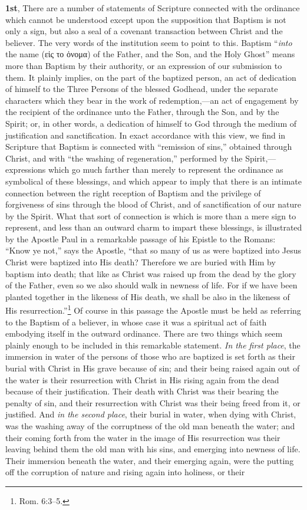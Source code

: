 \documentclass[
  english,
]{book}
\newcommand{\textgreek}[2][]{\foreignlanguage{greek}{#2}}
\begin{document}
\textbf{1st}, There are a number of statements of Scripture connected with the ordinance which cannot be understood except upon the supposition that Baptism is not only a sign, but also a seal of a covenant transaction between Christ and the believer. The very words of the institution seem to point to this. Baptism ``\emph{into} the name (\textgreek{εἰς το ὀνομα}) of the Father, and the Son, and the Holy Ghost'' means more than Baptism by their authority, or an expression of our submission to them. It plainly implies, on the part of the baptized person, an act of dedication of himself to the Three Persons of the blessed Godhead, under the separate characters which they bear in the work of redemption,---an act of engagement by the recipient of the ordinance unto the Father, through the Son, and by the Spirit; or, in other words, a dedication of himself to God through the medium of justification and sanctification. In exact accordance with this view, we find in Scripture that Baptism is connected with ``remission of sins,'' obtained through Christ, and with ``the washing of regeneration,'' performed by the Spirit,---expressions which go much farther than merely to represent the ordinance as symbolical of these blessings, and which appear to imply that there is an intimate connection between the right reception of Baptism and the privilege of forgiveness of sins through the blood of Christ, and of sanctification of our nature by the Spirit. What that sort of connection is which is more than a mere sign to represent, and less than an outward charm to impart these blessings, is illustrated by the Apostle Paul in a remarkable passage of his Epistle to the Romans: ``Know ye not,'' says the Apostle, ``that so many of us as were baptized into Jesus Christ were baptized into His death? Therefore we are buried with Him by baptism into death; that like as Christ was raised up from the dead by the glory of the Father, even so we also should walk in newness of life. For if we have been planted together in the likeness of His death, we shall be also in the likeness of His resurrection.''\footnote{Rom. 6:3--5.} Of course in this passage the Apostle must be held as referring to the Baptism of a believer, in whose case it was a spiritual act of faith embodying itself in the outward ordinance. There are two things which seem plainly enough to be included in this remarkable statement. \emph{In the first place}, the immersion in water of the persons of those who are baptized is set forth as their burial with Christ in His grave because of sin; and their being raised again out of the water is their resurrection with Christ in His rising again from the dead because of their justification. Their death with Christ was their bearing the penalty of sin, and their resurrection with Christ was their being freed from it, or justified. And \emph{in the second place}, their burial in water, when dying with Christ, was the washing away of the corruptness of the old man beneath the water; and their coming forth from the water in the image of His resurrection was their leaving behind them the old man with his sins, and emerging into newness of life. Their immersion beneath the water, and their emerging again, were the putting off the corruption of nature and rising again into holiness, or their 
\end{document}
